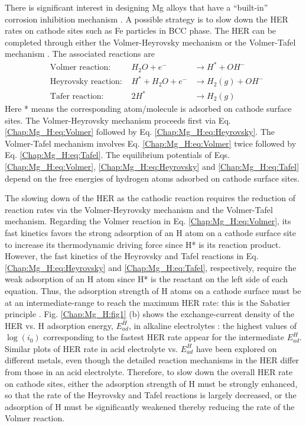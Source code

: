 There is significant interest in designing Mg alloys that have a “built-in” corrosion inhibition mechanism \cite{eaves2012inhibition}. A possible strategy is to slow down the HER rates on cathode sites such as Fe particles in \ac{BCC} phase. The HER can be completed through either the Volmer-Heyrovsky mechanism or the Volmer-Tafel mechanism \cite{ghali2010corrosion,walling1968electrochemical}. The associated reactions are
\begin{subequations}
\begin{align}
&\text{Volmer reaction:    } & H_2O + e^- & \rightarrow H^* + OH^-
 \label{Chap:Mg_H:eq:Volmer}\\
&\text{Heyrovsky reaction:    } & H^* + H_2O + e^- & \rightarrow H_2(g) + OH^-
 \label{Chap:Mg_H:eq:Heyrovsky}\\
&\text{Tafer reaction:    }
& 2H^* & \rightarrow H_2(g)
 \label{Chap:Mg_H:eq:Tafel}
\end{align}
\end{subequations}
Here * means the corresponding atom/molecule is adsorbed on cathode surface sites. The Volmer-Heyrovsky mechanism proceeds first via Eq. \ref{Chap:Mg_H:eq:Volmer} followed by Eq. \ref{Chap:Mg_H:eq:Heyrovsky}. The Volmer-Tafel mechanism involves Eq. \ref{Chap:Mg_H:eq:Volmer} twice followed by Eq. \ref{Chap:Mg_H:eq:Tafel}. The equilibrium potentials of Eqs. \ref{Chap:Mg_H:eq:Volmer}, \ref{Chap:Mg_H:eq:Heyrovsky} and \ref{Chap:Mg_H:eq:Tafel} depend on the free energies of hydrogen atoms adsorbed on cathode surface sites.


The slowing down of the HER as the cathodic reaction requires the reduction of reaction rates via the Volmer-Heyrovsky mechanism and the Volmer-Tafel mechanism. Regarding the Volmer reaction in Eq. \ref{Chap:Mg_H:eq:Volmer}, its fast kinetics favors the strong adsorption of an H atom on a cathode surface site to increase its thermodynamic driving force since H* is its reaction product. However, the fast kinetics of the Heyrovsky and Tafel reactions in Eq. \ref{Chap:Mg_H:eq:Heyrovsky} and \ref{Chap:Mg_H:eq:Tafel}, respectively, require the weak adsorption of an H atom since H* is the reactant on the left side of each equation. Thus, the adsorption strength of H atoms on a cathode surface must be at an intermediate-range to reach the maximum \ac{HER} rate: this is the Sabatier principle \cite{medford2015sabatier}. Fig. \ref{Chap:Mg_H:fig1} (b) shows the exchange-current density of the \ac{HER} vs. H adsorption energy, $E_{ad}^H$, in alkaline electrolytes \cite{sheng2013correlating}: the highest values of $\log(i_0)$ corresponding to the fastest \ac{HER} rate appear for the intermediate $E_{ad}^H$. Similar plots of \ac{HER} rate in acid electrolyte vs. $E_{ad}^H$ have been explored on different metals, even though the detailed reaction mechanisms in the \ac{HER} differ from those in an acid electrolyte. Therefore, to slow down the overall \ac{HER} rate on cathode sites, either the adsorption strength of H must be strongly enhanced, so that the rate of the Heyrovsky and Tafel reactions is largely decreased, or the adsorption of H must be significantly weakened thereby reducing the rate of the Volmer reaction.

